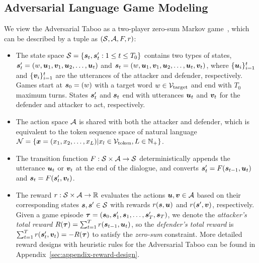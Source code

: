 \documentclass{article}
\theoremstyle{plain}
\theoremstyle{definition}
\theoremstyle{remark}
\begin{document}
\vspace{-3mm}
\subsection{Adversarial Language Game Modeling}
\vspace{-2mm}
We view the Adversarial Taboo as a two-player zero-sum Markov game~\citep{littman1994markov}, which can be described by a tuple as $({\mathcal{S}}, {\mathcal{A}}, F, r)$: 
\begin{itemize}[leftmargin=14pt]
    \item The state space ${\mathcal{S}} = \{{\bm{s}}_t, {\bm{s}}'_t : 1 \leq t\leq T_0\}$ contains two types of states, ${\bm{s}}'_t = (w, {\bm{u}}_1, {\bm{v}}_1, {\bm{u}}_2,  \dots, {\bm{u}}_t)$ and ${\bm{s}}_t = (w, {\bm{u}}_1, {\bm{v}}_1, {\bm{u}}_2, \dots, {\bm{u}}_t, {\bm{v}}_t)$, where $\{{\bm{u}}_i\}_{i=1}^t$ and $\{{\bm{v}}_i\}_{i=1}^t$ are the utterances of the attacker and defender, respectively.  
    Games start at ${\bm{s}}_0 = (w)$ with a target word $w \in {\mathcal{V}}_\text{target}$ and end with $T_0$ maximum turns. States ${\bm{s}}'_t$ and ${\bm{s}}_t$ end with utterances ${\bm{u}}_t$ and ${\bm{v}}_t$ for the defender and attacker to act, respectively. 
    \item The action space ${\mathcal{A}}$ is shared with both the attacker and defender, which is equivalent to the token sequence space of natural language ${\mathcal{N}}=\{{\bm{x}} = (x_1,x_2, \dots, x_L) | x_l \in {\mathcal{V}}_\text{token}, L\in \mathbb{N}_{+}\}$.  

    \item The transition function $F: {\mathcal{S}} \times {\mathcal{A}} \rightarrow {\mathcal{S}}$  deterministically appends the utterance ${\bm{u}}_t$ or ${\bm{v}}_t$ at the end of the dialogue, and converts ${\bm{s}}'_t = F({\bm{s}}_{t-1}, {\bm{u}}_t)$ and ${\bm{s}}_{t} =F({\bm{s}}'_{t}, {\bm{v}}_{t}) $.
    
    \item The reward $r: {\mathcal{S}} \times {\mathcal{A}} \rightarrow \mathbb{R}$ evaluates the actions ${\bm{u}},{\bm{v}} \in {\mathcal{A}}$ based on their corresponding states ${\bm{s}}, {\bm{s}}' \in {\mathcal{S}}$ with rewards $r({\bm{s}}, {\bm{u}})$ and $r({\bm{s}}', {\bm{v}})$, respectively. Given a game episode $\bm{\tau}=({\bm{s}}_0, {\bm{s}}'_1, {\bm{s}}_1, \dots, {\bm{s}}'_T,{\bm{s}}_T)$, we denote the \textit{attacker's total reward} $R(\bm{\tau}) =  \sum_{t=1}^T r({\bm{s}}_{t-1}, {\bm{u}}_t )$, so the \textit{defender's total reward} is $\sum_{t=1}^T r({\bm{s}}'_t, {\bm{v}}_t)= -R(\bm{\tau}) $ 
    to satisfy the
    \textit{zero-sum} constraint. More detailed reward designs with heuristic rules for the Adversarial Taboo can be found in Appendix~\ref{sec:appendix-reward-design}.
\end{itemize}
\end{document}
